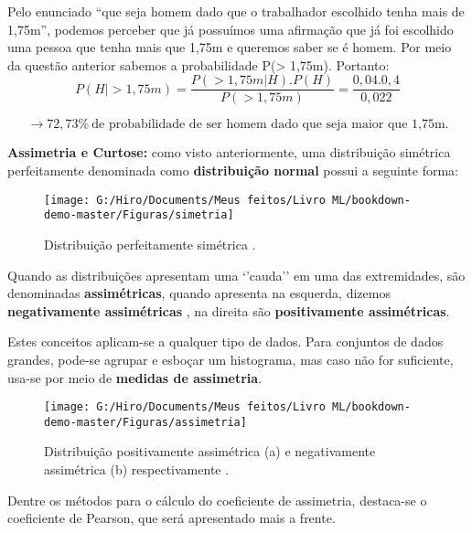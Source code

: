 \documentclass[
  openany]{book}
\begin{document}
Pelo enunciado ``que seja homem dado que o trabalhador escolhido tenha mais de 1,75m'', podemos perceber que já possuímos uma afirmação que já foi escolhido uma pessoa que tenha mais que 1,75m e queremos saber se é homem. Por meio da questão anterior sabemos a probabilidade P(\textgreater{} 1,75m). Portanto:
\[P(H| > 1, 75m) = \frac{P(> 1, 75m|H).P(H)}{P(> 1, 75m)}=\frac{0,04.0,4}{0, 022} \]

\[→ 72,73\% \ \mbox{de probabilidade de ser homem dado que seja maior que 1,75m.}\]

\textbf{Assimetria e Curtose:} como visto anteriormente, uma distribuição simétrica perfeitamente denominada como \textbf{distribuição normal} possui a seguinte forma:

\begin{figure}

{\centering \texttt{[image: G:/Hiro/Documents/Meus feitos/Livro ML/bookdown-demo-master/Figuras/simetria]} 

}

\caption{Distribuição perfeitamente simétrica \citep{freund2009estatistica}.}\label{fig:simetria}
\end{figure}



Quando as distribuições apresentam uma `'cauda'' em uma das extremidades, são denominadas \textbf{assimétricas}, quando apresenta na esquerda, dizemos \textbf{negativamente assimétricas} , na direita são \textbf{positivamente assimétricas}.

Estes conceitos aplicam-se a qualquer tipo de dados. Para conjuntos de dados grandes, pode-se agrupar e esboçar um histograma, mas caso não for suficiente, usa-se por meio de \textbf{medidas de assimetria}.

\begin{figure}

{\centering \texttt{[image: G:/Hiro/Documents/Meus feitos/Livro ML/bookdown-demo-master/Figuras/assimetria]} 

}

\caption{Distribuição positivamente assimétrica (a) e negativamente assimétrica (b) respectivamente \citep{freund2009estatistica}.}\label{fig:assimetria}
\end{figure}



Dentre os métodos para o cálculo do coeficiente de assimetria, destaca-se o coeficiente de Pearson, que será apresentado mais a frente.
\end{document}
